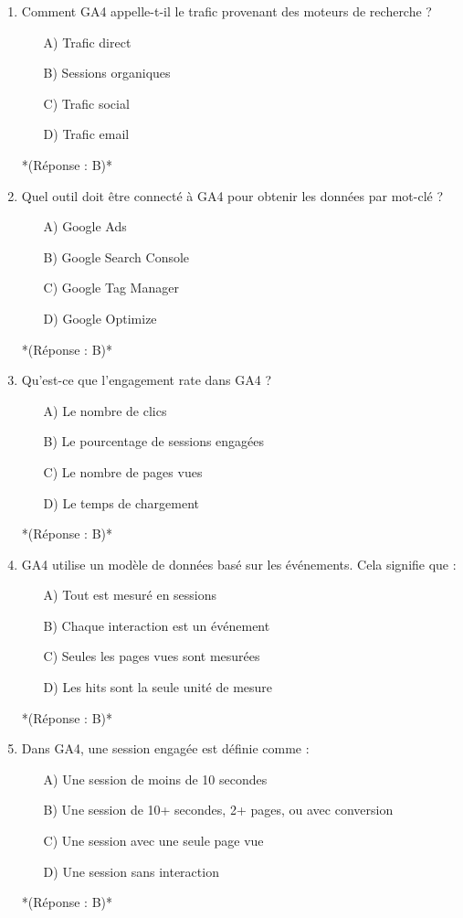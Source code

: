 \documentclass[12pt,a4paper,twoside]{report}
\begin{document}
\begin{enumerate}
    \item Comment GA4 appelle-t-il le trafic provenant des moteurs de recherche ?
    \begin{itemize}
        \item[A)] Trafic direct
        \item[B)] Sessions organiques
        \item[C)] Trafic social
        \item[D)] Trafic email
    \end{itemize}
    *(Réponse : B)*

    \item Quel outil doit être connecté à GA4 pour obtenir les données par mot-clé ?
    \begin{itemize}
        \item[A)] Google Ads
        \item[B)] Google Search Console
        \item[C)] Google Tag Manager
        \item[D)] Google Optimize
    \end{itemize}
    *(Réponse : B)*

    \item Qu'est-ce que l'engagement rate dans GA4 ?
    \begin{itemize}
        \item[A)] Le nombre de clics
        \item[B)] Le pourcentage de sessions engagées
        \item[C)] Le nombre de pages vues
        \item[D)] Le temps de chargement
    \end{itemize}
    *(Réponse : B)*

    \item GA4 utilise un modèle de données basé sur les événements. Cela signifie que :
    \begin{itemize}
        \item[A)] Tout est mesuré en sessions
        \item[B)] Chaque interaction est un événement
        \item[C)] Seules les pages vues sont mesurées
        \item[D)] Les hits sont la seule unité de mesure
    \end{itemize}
    *(Réponse : B)*

    \item Dans GA4, une session engagée est définie comme :
    \begin{itemize}
        \item[A)] Une session de moins de 10 secondes
        \item[B)] Une session de 10+ secondes, 2+ pages, ou avec conversion
        \item[C)] Une session avec une seule page vue
        \item[D)] Une session sans interaction
    \end{itemize}
    *(Réponse : B)*


\end{enumerate}
\end{document}
